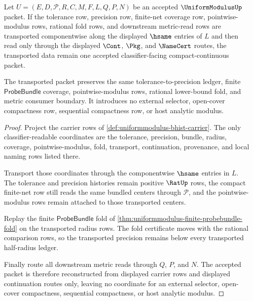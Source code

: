 \begin{theorem}
\label{thm:uniformmodulus-classifier-transport-stability}
Let $U=(E,D,\mathcal{P},R,C,M,F,L,Q,P,N)$ be an accepted $\UniformModulusUp$ packet. If the tolerance row, precision row, finite-net coverage row, pointwise-modulus rows, rational fold rows, and downstream metric-read rows are transported componentwise along the displayed $\hsame$ entries of $L$ and then read only through the displayed $\Cont$, $\Pkg$, and $\NameCert$ routes, the transported data remain one accepted classifier-facing compact-continuous packet.

The transported packet preserves the same tolerance-to-precision ledger, finite $\mathsf{ProbeBundle}$ coverage, pointwise-modulus rows, rational lower-bound fold, and metric consumer boundary. It introduces no external selector, open-cover compactness row, sequential compactness row, or host analytic modulus.
\end{theorem}
\begin{proof}
Project the carrier rows of \autoref{def:uniformmodulus-bhist-carrier}. The only classifier-readable coordinates are the tolerance, precision, bundle, radius, coverage, pointwise-modulus, fold, transport, continuation, provenance, and local naming rows listed there.

Transport those coordinates through the componentwise $\hsame$ entries in $L$. The tolerance and precision histories remain positive $\RatUp$ rows, the compact finite-net row still reads the same bundled centers through $\mathcal{P}$, and the pointwise-modulus rows remain attached to those transported centers.

Replay the finite $\mathsf{ProbeBundle}$ fold of \autoref{thm:uniformmodulus-finite-probebundle-fold} on the transported radius rows. The fold certificate moves with the rational comparison rows, so the transported precision remains below every transported half-radius ledger.

Finally route all downstream metric reads through $Q$, $P$, and $N$. The accepted packet is therefore reconstructed from displayed carrier rows and displayed continuation routes only, leaving no coordinate for an external selector, open-cover compactness, sequential compactness, or host analytic modulus.
\end{proof}

